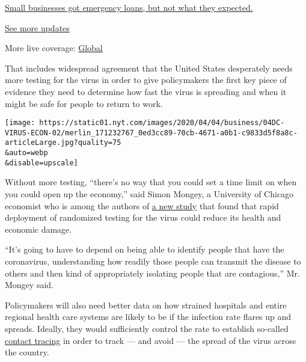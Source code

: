 \href{https://www.nytimes.com/live/2020/08/03/business/stock-market-today-coronavirus?action=click\&pgtype=Article\&state=default\&region=MAIN_CONTENT_1\&context=storylines_live_updates\#small-businesses-got-emergency-loans-but-not-what-they-expected}{Small
businesses got emergency loans, but not what they expected.}

\href{https://www.nytimes.com/live/2020/08/03/business/stock-market-today-coronavirus?action=click\&pgtype=Article\&state=default\&region=MAIN_CONTENT_1\&context=storylines_live_updates}{See
more updates}

More live coverage:
\href{https://www.nytimes.com/2020/08/04/world/coronavirus-covid-19.html?action=click\&pgtype=Article\&state=default\&region=MAIN_CONTENT_1\&context=storylines_live_updates}{Global}

That includes widespread agreement that the United States desperately
needs more testing for the virus in order to give policymakers the first
key piece of evidence they need to determine how fast the virus is
spreading and when it might be safe for people to return to work.

\texttt{[image: https://static01.nyt.com/images/2020/04/04/business/04DC-VIRUS-ECON-02/merlin\_171232767\_0ed3cc89-70cb-4671-a0b1-c9833d5f8a8c-articleLarge.jpg?quality=75\\\&auto=webp\\\&disable=upscale]}

Without more testing, ``there's no way that you could set a time limit
on when you could open up the economy,'' said Simon Mongey, a University
of Chicago economist who is among the authors of
\href{https://bfi.uchicago.edu/working-paper/working-paper-2020-25/}{a
new study} that found that rapid deployment of randomized testing for
the virus could reduce its health and economic damage.

``It's going to have to depend on being able to identify people that
have the coronavirus, understanding how readily those people can
transmit the disease to others and then kind of appropriately isolating
people that are contagious,'' Mr. Mongey said.

Policymakers will also need better data on how strained hospitals and
entire regional health care systems are likely to be if the infection
rate flares up and spreads. Ideally, they would sufficiently control the
rate to establish so-called
\href{https://www.nytimes.com/2020/03/30/us/politics/trump-governors-coronavirus-testing.html}{contact
tracing} in order to track --- and avoid --- the spread of the virus
across the country.

